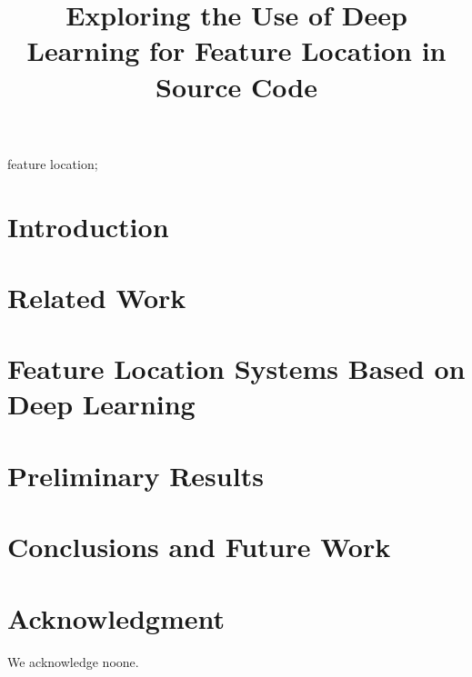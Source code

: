 \documentclass[conference]{IEEEtran}
\begin{document}
\title{Exploring the Use of Deep Learning for Feature Location in Source Code}
\author{
    \and
    \and
}


\maketitle

\begin{abstract}
\end{abstract}

\begin{IEEEkeywords}
feature location;
\end{IEEEkeywords}

\section{Introduction}\label{introduction}         


\section{Related Work}\label{related}


\section{Feature Location Systems Based on Deep Learning}\label{design}


\section{Preliminary Results}\label{results}


\section{Conclusions and Future Work}\label{futurework}


\section*{Acknowledgment}
We acknowledge noone.



\end{document}
